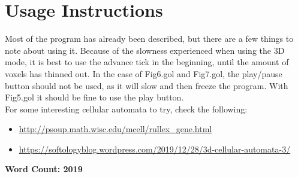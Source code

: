 \documentclass[11pt]{article}
\begin{document}
\section{Usage Instructions}
\label{sec:org3b5e150}
Most of the program has already been described, but there are a few things to
note about using it.  Because of the slowness experienced when using the 3D
mode, it is best to use the advance tick in the beginning, until the amount of
voxels has thinned out.  In the case of Fig6.gol and Fig7.gol, the play/pause
button should not be used, as it will slow and then freeze the program.  With
Fig5.gol it should be fine to use the play button.\\

For some interesting cellular automata to try, check the following:
\begin{itemize}
\item \url{http://psoup.math.wisc.edu/mcell/rullex\_gene.html}
\item \url{https://softologyblog.wordpress.com/2019/12/28/3d-cellular-automata-3/}
\end{itemize}

\textbf{Word Count: 2019}
\end{document}
